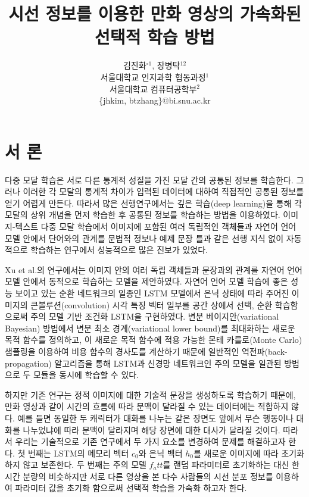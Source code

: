 \documentclass{kcc}
\title{시선 정보를 이용한 만화 영상의 가속화된 선택적 학습 방법}
\author{
김진화$^{\circ1}$, 장병탁$^{12}$\\
서울대학교 인지과학 협동과정$^{1}$\\
서울대학교 컴퓨터공학부$^{2}$\\
\{jhkim, btzhang\}@bi.snu.ac.kr
}
\begin{document}
\maketitle


\section{서 론}

다중 모달 학습은 서로 다른 통계적 성질을 가진 모달 간의 공통된 정보를 학습한다. 그러나 이러한 각 모달의 통계적 차이가 입력된 데이터에 대하여 직접적인 공통된 정보를 얻기 어렵게 만든다. 따라서 많은 선행연구에서는 깊은 학습(deep learning)을 통해 각 모달의 상위 개념을 먼저 학습한 후 공통된 정보를 학습하는 방법을 이용하였다\cite{Ngiam2011,NIPS2012_4683,Kiros2013,NIPS2014_5279}. 이미지-텍스트 다중 모달 학습에서 이미지에 포함된 여러 독립적인 객체들과 자연어 언어 모델 안에서 단어와의 관계를 문법적 정보나 예제 문장 틀과 같은 선행 지식 없이 자동적으로 학습하는 연구에서 성능적으로 많은 진보가 있었다\cite{Kiros2013,Yu2013,Karpathy}.

Xu et al.\cite{Xu2015}의 연구에서는 이미지 안의 여러 독립 객체들과 문장과의 관계를 자연어 언어 모델 안에서 동적으로 학습하는 모델을 제안하였다. 자연어 언어 모델 학습에 좋은 성능 보이고 있는 순환 네트워크의 일종인 LSTM 모델에서 은닉 상태에 따라 주어진 이미지의 콘볼루션(convolution) 시각 특징 벡터 일부를 공간 상에서 선택, 순환 학습함으로써 주의 모델 기반 조건화 LSTM을 구현하였다. 변분 베이지안(variational Bayesian) 방법에서 변분 최소 경계(variational lower bound)를 최대화하는 새로운 목적 함수를 정의하고, 이 새로운 목적 함수에 적용 가능한 몬테 카를로(Monte Carlo) 샘플링을 이용하여 비용 함수의 경사도를 계산하기 때문에 일반적인 역전파(back-propagation) 알고리즘을 통해 LSTM과 신경망 네트워크인 주의 모델을 일관된 방법으로 두 모듈을 동시에 학습할 수 있다.

하지만 기존 연구는 정적 이미지에 대한 기술적 문장을 생성하도록 학습하기 때문에, 만화 영상과 같이 시간의 흐름에 따라 문맥이 달라질 수 있는 데이터에는 적합하지 않다. 예를 들면 동일한 두 캐릭터가 대화를 나누는 같은 장면도 앞에서 무슨 행동이나 대화를 나누었냐에 따라 문맥이 달라지며 해당 장면에 대한 대사가 달라질 것이다. 따라서 우리는 기술적으로 기존 연구에서 두 가지 요소를 변경하여 문제를 해결하고자 한다. 첫 번째는 LSTM의 메모리 벡터 $c_0$와 은닉 벡터 $h_0$를 새로운 이미지에 따라 초기화 하지 않고 보존한다. 두 번째는 주의 모델 $f_att$를 랜덤 파라미터로 초기화하는 대신 한 시간 분량의 비슷하지만 서로 다른 영상을 본 다수 사람들의 시선 분포 정보를 이용하여 파라미터 값을 초기화 함으로써 선택적 학습을 가속화 하고자 한다.  
\end{document}
